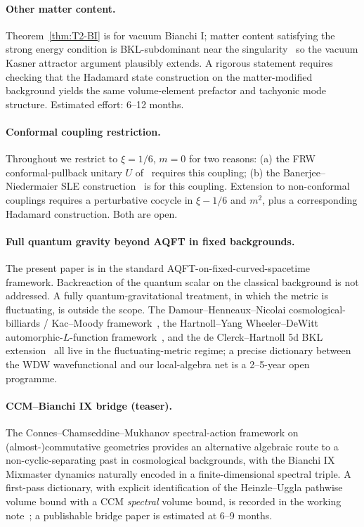 \documentclass[11pt]{article}
\theoremstyle{definition}
\begin{document}
\paragraph{Other matter content.} Theorem~\ref{thm:T2-BI} is for vacuum Bianchi I; matter content satisfying the strong energy condition is BKL-subdominant near the singularity~\cite{BKL1970} so the vacuum Kasner attractor argument plausibly extends. A rigorous statement requires checking that the Hadamard state construction on the matter-modified background yields the same volume-element prefactor and tachyonic mode structure. Estimated effort: 6--12 months.

\paragraph{Conformal coupling restriction.} Throughout we restrict to $\xi=1/6$, $m=0$ for two reasons: (a) the FRW conformal-pullback unitary $U$ of~\cite[Prop.~3.3]{frw_note} requires this coupling; (b) the Banerjee--Niedermaier SLE construction~\cite{BanerjeeNiedermaier2023} is for this coupling. Extension to non-conformal couplings requires a perturbative cocycle in $\xi-1/6$ and $m^2$, plus a corresponding Hadamard construction. Both are open.

\paragraph{Full quantum gravity beyond AQFT in fixed backgrounds.} The present paper is in the standard AQFT-on-fixed-curved-spacetime framework. Backreaction of the quantum scalar on the classical background is not addressed. A fully quantum-gravitational treatment, in which the metric is fluctuating, is outside the scope. The Damour--Henneaux--Nicolai cosmological-billiards / Kac--Moody framework~\cite{DHN2002,DamourNicolai2004}, the Hartnoll--Yang Wheeler--DeWitt automorphic-$L$-function framework~\cite{HartnollYang2025}, and the de Clerck--Hartnoll 5d BKL extension~\cite{DeClerckHartnoll2025} all live in the fluctuating-metric regime; a precise dictionary between the WDW wavefunctional and our local-algebra net is a 2--5-year open programme.

\paragraph{CCM--Bianchi IX bridge (teaser).} The Connes--Chamseddine--Mukhanov spectral-action framework on (almost-)commutative geometries provides an alternative algebraic route to a non-cyclic-separating past in cosmological backgrounds, with the Bianchi IX Mixmaster dynamics naturally encoded in a finite-dimensional spectral triple. A first-pass dictionary, with explicit identification of the Heinzle--Uggla pathwise volume bound with a CCM \emph{spectral} volume bound, is recorded in the working note~\cite{CCM_BIX_dictionary_max}; a publishable bridge paper is estimated at 6--9 months.
\end{document}
